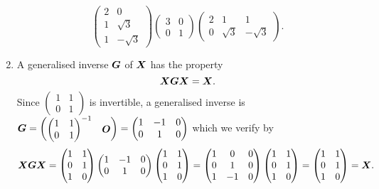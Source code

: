 \documentclass{report}
\begin{document}
\begin{enumerate}
$$\begin{pmatrix}
			2 & 0 \\ 1 & \sqrt{3} \\ 1 & -\sqrt{3}
		\end{pmatrix}\begin{pmatrix}
		3 & 0 \\ 0 & 1
		\end{pmatrix}\begin{pmatrix}
		2 & 1 & 1 \\ 0 & \sqrt{3} & -\sqrt{3}
		\end{pmatrix}.$$
		\item A generalised inverse $\boldsymbol{G}$ of $\boldsymbol{X}$ has the property
		$$\boldsymbol{X}\boldsymbol{G}\boldsymbol{X}=\boldsymbol{X}.$$
		Since $\begin{pmatrix}
			1 & 1 \\ 0 & 1
		\end{pmatrix}$ is invertible, a generalised inverse is
		$\boldsymbol{G}=\begin{pmatrix}
			\begin{pmatrix}
				1 & 1 \\ 0 & 1
			\end{pmatrix}^{-1} & \boldsymbol{O}
		\end{pmatrix}=\begin{pmatrix}
			1 & -1 & 0 \\ 0 & 1 & 0
		\end{pmatrix}$ which we verify by
		$$\boldsymbol{X}\boldsymbol{G}\boldsymbol{X}=\begin{pmatrix}
			1 & 1 \\ 0 & 1 \\ 1 & 0
		\end{pmatrix}\begin{pmatrix}
		1 & -1 & 0 \\ 0 & 1 & 0
		\end{pmatrix}\begin{pmatrix}
		1 & 1 \\ 0 & 1 \\ 1 & 0
		\end{pmatrix}=\begin{pmatrix}
		1 & 0 & 0 \\ 0 & 1 & 0 \\ 1 & -1 & 0
		\end{pmatrix}\begin{pmatrix}
		1 & 1 \\ 0 & 1 \\ 1 & 0
		\end{pmatrix}=\begin{pmatrix}
		1 & 1 \\ 0 & 1 \\ 1 & 0
		\end{pmatrix}=\boldsymbol{X}.$$
	\end{enumerate}
\end{document}
